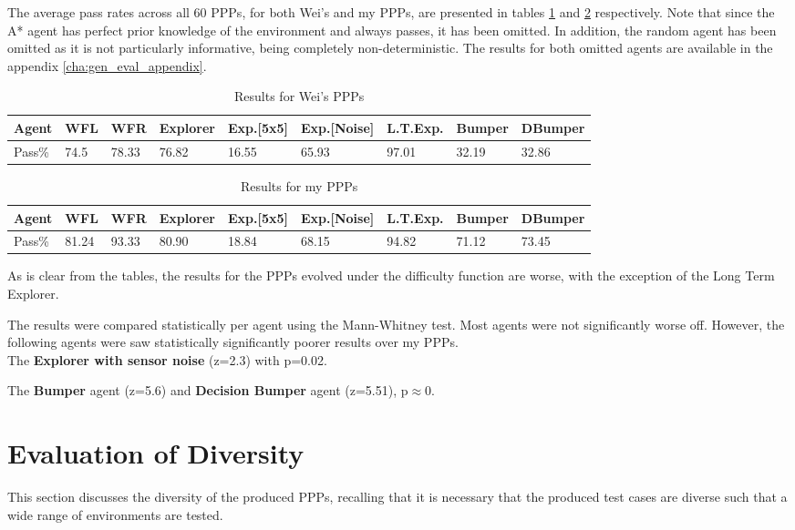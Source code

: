 \documentclass[authoryearcitations]{UoYCSproject}
\begin{document}
The average pass rates across all 60 PPPs, for both Wei's and my PPPs, are presented in tables \ref{table:wei_eval} and \ref{table:diff_eval} respectively. Note that since the A* agent has perfect prior knowledge of the environment and always passes, it has been omitted. In addition, the random agent has been omitted as it is not particularly informative, being completely non-deterministic. The results for both omitted agents are available in the appendix \ref{cha:gen_eval_appendix}.
\begin{table}
\begin{tabular}{|l|l|l|l|l|l|l|l|l|}
\hline
Agent&WFL&WFR&Explorer&Exp.[5x5]&Exp.[Noise]&L.T.Exp.&Bumper&DBumper\\
\hline
Pass\%&74.5&78.33&76.82&16.55&65.93&97.01&32.19&32.86\\
\hline
\end{tabular}
\caption{Results for Wei's PPPs}
\label{table:wei_eval}
\end{table}

\begin{table}
\begin{tabular}{|l|l|l|l|l|l|l|l|l|}
\hline
Agent&WFL&WFR&Explorer&Exp.[5x5]&Exp.[Noise]&L.T.Exp.&Bumper&DBumper\\
\hline

Pass\%&81.24&93.33&80.90&18.84&68.15&94.82&71.12&73.45\\
\hline
\end{tabular}
\caption{Results for my PPPs}
\label{table:diff_eval}
\end{table}

As is clear from the tables, the results for the PPPs evolved under the difficulty function are worse, with the exception of the Long Term Explorer.

The results were compared statistically per agent using the Mann-Whitney test. Most agents were not significantly worse off. However, the following agents were saw statistically significantly poorer results over my PPPs. \\

The \textbf{Explorer with sensor noise} (z=2.3) with p=0.02.

The \textbf{Bumper} agent (z=5.6) and \textbf{Decision Bumper} agent (z=5.51), p$\approx$0.

\section{Evaluation of Diversity}
\label{sec:div_eval}
This section discusses the diversity of the produced PPPs, recalling that it is necessary that the produced test cases are diverse such that a wide range of environments are tested.
\end{document}
